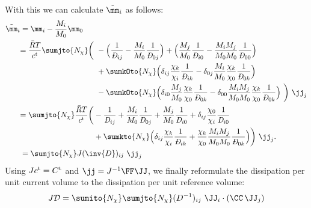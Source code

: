 With this we can calculate $\tilde\mm_i$ as follows:
\begin{align}
  \begin{aligned}
    \tilde\mm_i &= \mm_i-\frac{M_i}{M_0}\mm_0  \\
                & 
                \begin{aligned}
                  =\frac{\RT}{\ct} \sumjto{\Nchi} \bigg( \ &  
                    -\Big(\frac{1}{\DiffMS_{ij}} - \frac{M_i}{M_0}\frac{1}{\DiffMS_{0j}} \Big) 
                    +\Big(\frac{M_j}{M_0}\frac{1}{\DiffMS_{i0}} - \frac{M_i M_j}{M_0 M_0}\frac{1}{\DiffMS_{00}} \Big) \\
                  & + \sumkOto{\Nchi} \Big( 
                          \delta_{ij}\frac{\chi_k}{\chi_i}\frac{1}{\DiffMS_{ik}} 
                        - \delta_{0j}\frac{M_i}{M_0}\frac{\chi_k}{\chi_0}\frac{1}{\DiffMS_{0k}}
                      \Big)  \\
                  & - \sumkOto{\Nchi}\Big(
                          \delta_{i0}\frac{M_j}{M_0}\frac{\chi_k}{\chi_0}\frac{1}{\DiffMS_{0k}}
                        - \delta_{00}\frac{M_i M_j}{M_0 M_0}\frac{\chi_k}{\chi_0}\frac{1}{\DiffMS_{0k}}\Big) \ \bigg) \ \jj_j
                \end{aligned}  \\
                &
                \begin{aligned}   
                  = \sumjto{\Nchi} \frac{\RT}{\ct} \bigg(  
                  &- \frac{1}{\DiffMS_{ij}} 
                  + \frac{M_i}{M_0}\frac{1}{\DiffMS_{0j}} 
                  + \frac{M_j}{M_0}\frac{1}{\DiffMS_{i0}}  
                  + \delta_{ij}\frac{\chi_0}{\chi_i}\frac{1}{\DiffMS_{i0}} \\
                  &+ \sumkto{\Nchi} \Big( \delta_{ij} \frac{\chi_k}{\chi_i}\frac{1}{\DiffMS_{ik}} + \frac{\chi_k}{\chi_0}\frac{M_i M_j}{M_0 M_0} \frac{1}{\DiffMS_{0k}} \Big) 
                  \bigg) \ \jj_j.
                \end{aligned} \\
                &=\sumjto{\Nchi} J (\inv{D})_{ij} \ \jj_j 
  \end{aligned}
\end{align}
Using $Jc^{\rm t} = C^{\rm t}$ and  $\jj = J^{-1} \FF\JJ$, we finally reformulate the dissipation per unit current volume to the dissipation per unit reference volume:
\begin{align}
  J\Diss = \sumito{\Nchi}\sumjto{\Nchi} \Dijinv \ \JJ_i \cdot (\CC \, \JJ_j)
\end{align}
